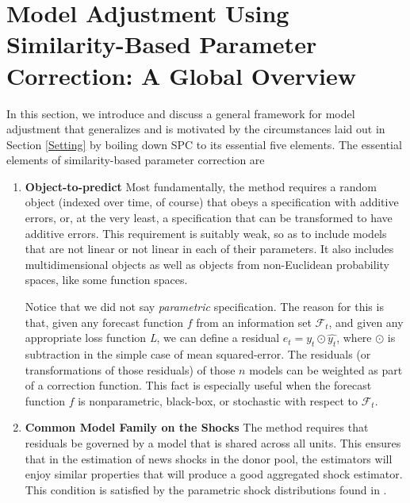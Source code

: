 \documentclass[11pt]{article}
\theoremstyle{definition}
\begin{document}
\section{Model Adjustment Using Similarity-Based Parameter Correction: A Global Overview}\label{global_overview}

In this section, we introduce and discuss a general framework for model adjustment that generalizes and is motivated by the circumstances laid out in Section \ref{Setting} by boiling down SPC to its essential five elements.  The essential elements of similarity-based parameter correction are

\begin{enumerate}
  \item \textbf{Object-to-predict}
  Most fundamentally, the method requires a random object (indexed over time, of course) that obeys a specification with additive errors, or, at the very least, a specification that can be transformed to have additive errors.  This requirement is suitably weak, so as to include models that are not linear or not linear in each of their parameters.  It also includes multidimensional objects as well as objects from non-Euclidean probability spaces, like some function spaces.  

Notice that we did not say \textit{parametric} specification.  The reason for this is that, given any forecast function $f$ from an information set $\mathcal{F}_{t}$, and given any appropriate loss function \textit{L}, we can define a residual $e_{t} = y_{t} \odot \hat{y_{t}}$, where $\odot$ is subtraction in the simple case of mean squared-error.  The residuals (or transformations of those residuals) of those $n$ models can be weighted as part of a correction function.  This fact is especially useful when the forecast function $f$ is nonparametric, black-box, or stochastic with respect to $\mathcal{F}_{t}$.

\item \textbf{Common Model Family on the Shocks} The method requires that residuals be governed by a model that is shared across all units.  This ensures that in the estimation of news shocks in the donor pool, the estimators will enjoy similar properties that will produce a good aggregated shock estimator.  This condition is satisfied by the parametric shock distributions found in \cite{lin2021minimizing,lundquist2024volatility}.


\end{enumerate}
\end{document}
